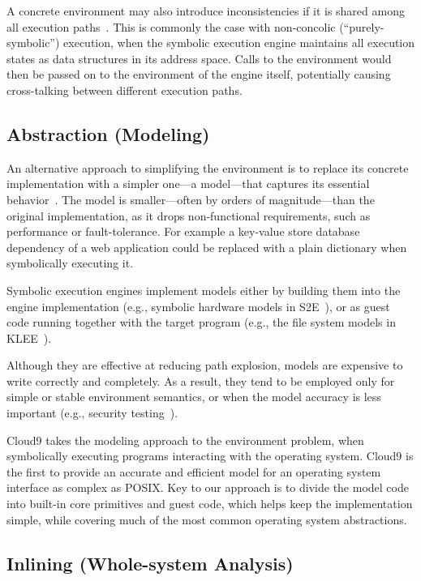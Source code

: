A concrete environment may also introduce inconsistencies if it is shared among all execution paths~\cite{klee}.
%
This is commonly the case with non-concolic (``purely-symbolic'') execution, when the symbolic execution engine maintains all execution states as data structures in its address space.  Calls to the environment would then be passed on to the environment of the engine itself, potentially causing cross-talking between different execution paths.

\subsection{Abstraction (Modeling)}

An alternative approach to simplifying the environment is to replace its concrete implementation with a simpler one---a model---that captures its essential behavior~\cite{klee,mayhem,aeg}.
%
The model is smaller---often by orders of magnitude---than the original implementation, as it drops non-functional requirements, such as performance or fault-tolerance.  For example a key-value store database dependency of a web application could be replaced with a plain dictionary when symbolically executing it.

Symbolic execution engines implement models either by building them into the engine implementation (e.g., symbolic hardware models in S2E~\cite{s2eSystem}), or as guest code running together with the target program (e.g., the file system models in KLEE~\cite{klee}).

Although they are effective at reducing path explosion, models are expensive to write correctly and completely.  As a result, they tend to be employed only for simple or stable environment semantics, or when the model accuracy is less important (e.g., security testing~\cite{aeg}).

Cloud9 takes the modeling approach to the environment problem, when symbolically executing programs interacting with the operating system.  Cloud9 is the first to provide an accurate and efficient model for an operating system interface as complex as POSIX.  Key to our approach is to divide the model code into built-in core primitives and guest code, which helps keep the implementation simple, while covering much of the most common operating system abstractions.

\subsection{Inlining (Whole-system Analysis)}

